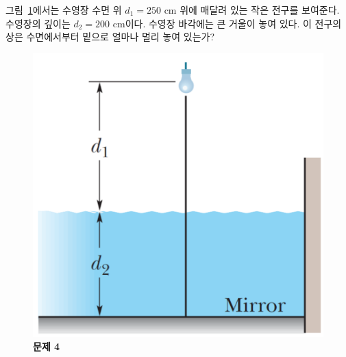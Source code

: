 \documentclass[tightenlines,floatfix,nofootinbib,superscriptaddress,fleqn]{revtex4}
\begin{document}
그림~\ref{fig:2}에서는 수영장 수면 위 $d_1=250$ cm 위에 매달려 있는
작은 전구를 보여준다. 수영장의 깊이는 $d_2=200$ cm이다. 수영장
바각에는 큰 거울이 놓여 있다. 이 전구의 상은 수면에서부터 밑으로 얼마나 멀리
놓여 있는가? 
\begin{figure}[htp]
  \centering
  \includegraphics[scale=0.35]{qfig13-4-20221031.pdf} 
  \caption{\textbf{문제 4}}
  \label{fig:2}
\end{figure}
\end{document}
